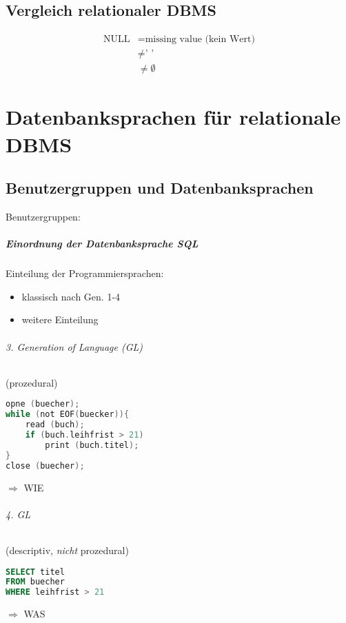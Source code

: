 \section{Vergleich relationaler DBMS}
\begin{align*}
\text{NULL} &= \text{missing value (kein Wert)}\\
&\not = \text{' '}\\
&\not = \emptyset
\end{align*}

\chapter{Datenbanksprachen für relationale DBMS}
\section{Benutzergruppen und Datenbanksprachen}
Benutzergruppen:\\
\paragraph{Einordnung der Datenbanksprache SQL}
Einteilung der Programmiersprachen:
\begin{itemize}
\item klassisch nach Gen. 1-4
\item weitere Einteilung
\end{itemize}
\subparagraph{3. Generation of Language (GL)}
(prozedural)
\begin{lstlisting}[language=C]
opne (buecher);
while (not EOF(buecker)){
	read (buch);
	if (buch.leihfrist > 21)
		print (buch.titel);
}
close (buecher);
\end{lstlisting}
$\Rightarrow$ WIE
\subparagraph{4. GL}
(descriptiv, \emph{nicht} prozedural)
\begin{lstlisting}[language=SQL]
SELECT titel
FROM buecher
WHERE leihfrist > 21
\end{lstlisting}
$\Rightarrow$ WAS

